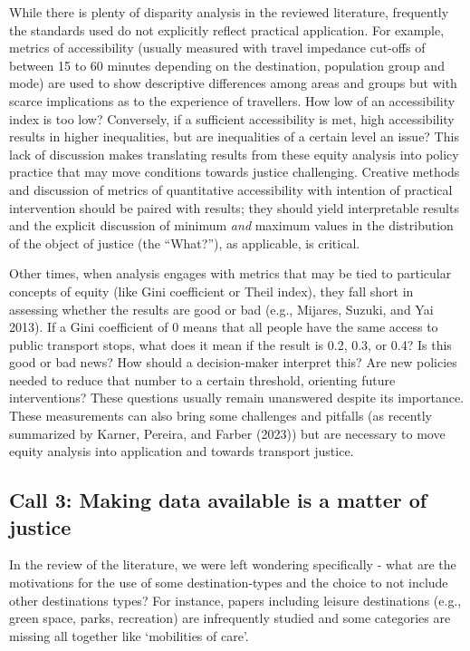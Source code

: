 \documentclass[12pt, oneside]{report}
\begin{document}
While there is plenty of disparity analysis in the reviewed literature,
frequently the standards used do not explicitly reflect practical
application. For example, metrics of accessibility (usually measured
with travel impedance cut-offs of between 15 to 60 minutes depending on
the destination, population group and mode) are used to show descriptive
differences among areas and groups but with scarce implications as to
the experience of travellers. How low of an accessibility index is too
low? Conversely, if a sufficient accessibility is met, high
accessibility results in higher inequalities, but are inequalities of a
certain level an issue? This lack of discussion makes translating
results from these equity analysis into policy practice that may move
conditions towards justice challenging. Creative methods and discussion
of metrics of quantitative accessibility with intention of practical
intervention should be paired with results; they should yield
interpretable results and the explicit discussion of minimum \emph{and}
maximum values in the distribution of the object of justice (the
``What?''), as applicable, is critical.

Other times, when analysis engages with metrics that may be tied to
particular concepts of equity (like Gini coefficient or Theil index),
they fall short in assessing whether the results are good or bad (e.g.,
Mijares, Suzuki, and Yai 2013). If a Gini coefficient of 0 means that
all people have the same access to public transport stops, what does it
mean if the result is 0.2, 0.3, or 0.4? Is this good or bad news? How
should a decision-maker interpret this? Are new policies needed to
reduce that number to a certain threshold, orienting future
interventions? These questions usually remain unanswered despite its
importance. These measurements can also bring some challenges and
pitfalls (as recently summarized by Karner, Pereira, and Farber (2023))
but are necessary to move equity analysis into application and towards
transport justice.

\hypertarget{call-3-making-data-available-is-a-matter-of-justice}{%
\subsection{Call 3: Making data available is a matter of
justice}\label{call-3-making-data-available-is-a-matter-of-justice}}

In the review of the literature, we were left wondering specifically -
what are the motivations for the use of some destination-types and the
choice to not include other destinations types? For instance, papers
including leisure destinations (e.g., green space, parks, recreation)
are infrequently studied and some categories are missing all together
like `mobilities of care'.
\end{document}
